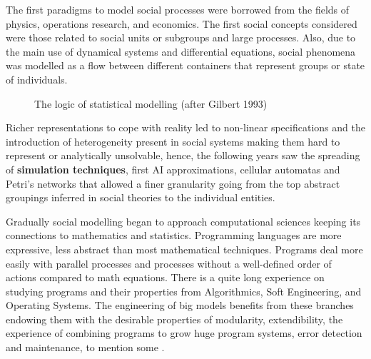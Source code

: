 \documentclass[11pt,oneside,a4paper,openright]{report}
\begin{document}
The first paradigms to model social processes were borrowed from the fields of physics, operations research, and economics. The first social concepts considered were those related to social units or subgroups and large processes. Also, due to the main use of dynamical systems and differential equations, social phenomena was modelled as a flow between different containers that represent groups or state of individuals.

\begin{figure}[!htb]
\centering
\setlength\fboxsep{0pt}
\setlength\fboxrule{0.5pt}
\caption{The logic of statistical modelling (after Gilbert 1993)\cite{GilbertTroitzsch}}
\label{fig:SimStatMod}
\end{figure}

Richer representations to cope with reality led to non-linear specifications and the introduction of heterogeneity present in social systems making them hard to represent or analytically unsolvable, hence, the following years saw the spreading of \textbf{simulation techniques}, first AI approximations, cellular automatas and Petri's networks that allowed a finer granularity going from the top abstract groupings inferred in social theories to the individual entities\cite[chap.1,p.6-9]{GilbertTroitzsch}. 


Gradually social modelling began to approach computational sciences keeping its connections to mathematics and statistics. Programming languages are more expressive, less abstract than most mathematical techniques. Programs deal more easily with parallel processes and processes without a well-defined order of actions compared to math equations. There is a quite long experience on studying programs and their properties from Algorithmics, Soft Engineering, and Operating Systems. The engineering of big models benefits from these branches endowing them with the desirable properties of modularity, extendibility, the experience of combining programs to grow huge program systems, error detection and maintenance, to mention some \cite{TaberAndTimpone1996}.
\end{document}
